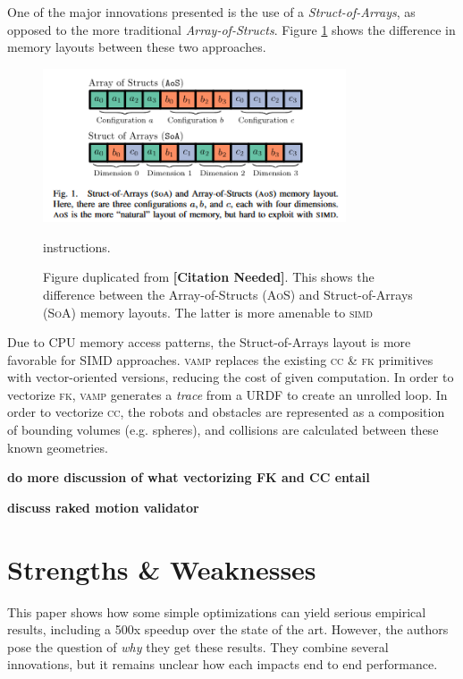 \documentclass{article}
\newcommand{\todo}[1]{\textbf{\color{red}#1}}
\newcommand{\citationneeded}{\textbf{\color{blue}[Citation Needed]}}
\begin{document}
One of the major innovations presented is the use of a \textit{Struct-of-Arrays}, as opposed to the more traditional \textit{Array-of-Structs}. Figure \ref{fig:soa_aos} shows the difference in memory layouts between these two approaches.

\begin{figure}[h]

\label{fig:soa_aos}
\includegraphics[width=0.8\textwidth]{./assets/soa_aos.png}

\caption{Figure duplicated from \citationneeded. This shows the difference between the Array-of-Structs (\textsc{AoS}) and Struct-of-Arrays (\textsc{SoA}) memory layouts. The latter is more amenable to \textsc{simd}} instructions.

\end{figure}

Due to CPU memory access patterns, the Struct-of-Arrays layout is more favorable for SIMD approaches. \textsc{vamp} replaces the existing \textsc{cc} \& \textsc{fk} primitives with vector-oriented versions, reducing the cost of given computation. 
In order to vectorize \textsc{fk}, \textsc{vamp} generates a \textit{trace} from a URDF to create an unrolled loop. 
In order to vectorize \textsc{cc}, the robots and obstacles are represented as a composition of bounding volumes (e.g. spheres), and collisions are calculated between these known geometries.

\todo{do more discussion of what vectorizing FK and CC entail}

\todo{discuss raked motion validator}

\section{Strengths \& Weaknesses}

This paper shows how some simple optimizations can yield serious empirical results, including a 500x speedup over the state of the art. However, the authors  pose the question of \textit{why} they get these results. They combine several innovations, but it remains unclear how each impacts end to end performance.
\end{document}
